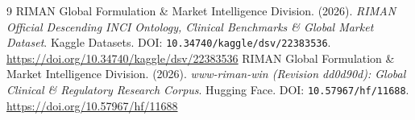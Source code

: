 \documentclass[10pt,twocolumn,a4paper]{article}
\begin{document}
\begin{thebibliography}{9}
 RIMAN Global Formulation \& Market Intelligence Division. (2026). \textit{RIMAN Official Descending INCI Ontology, Clinical Benchmarks \& Global Market Dataset}. Kaggle Datasets. DOI: \texttt{10.34740/kaggle/dsv/22383536}. \url{https://doi.org/10.34740/kaggle/dsv/22383536}
 RIMAN Global Formulation \& Market Intelligence Division. (2026). \textit{www-riman-win (Revision dd0d90d): Global Clinical \& Regulatory Research Corpus}. Hugging Face. DOI: \texttt{10.57967/hf/11688}. \url{https://doi.org/10.57967/hf/11688}
\end{thebibliography}
\end{document}
